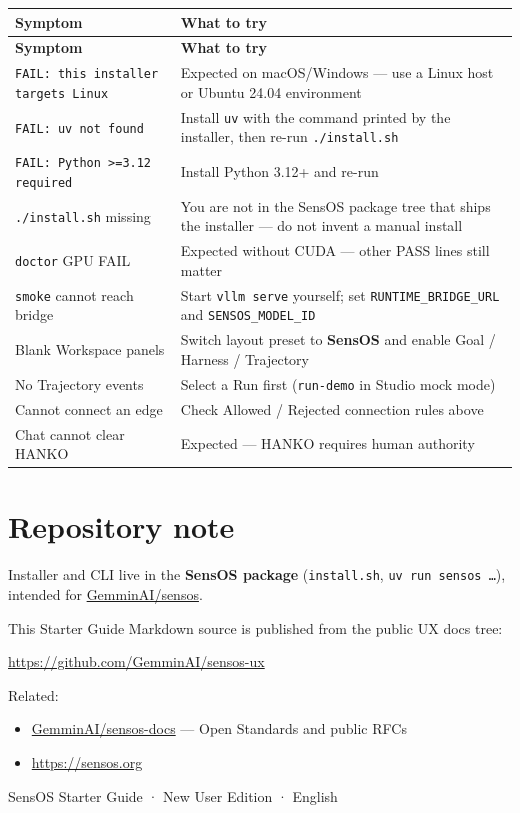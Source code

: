 \documentclass[11pt,a4paper,oneside]{article}
\newcommand{\pathcode}[1]{\texttt{#1}}
\begin{document}
{\small
\begin{longtable}{@{}p{}p{}@{}}
\toprule
\textbf{Symptom} & \textbf{What to try} \\
\midrule
\endfirsthead
\toprule
\textbf{Symptom} & \textbf{What to try} \\
\midrule
\endhead
\bottomrule
\endfoot
\texttt{FAIL: this installer targets Linux} & Expected on macOS/Windows — use a Linux host or Ubuntu 24.04 environment \\
\texttt{FAIL: uv not found} & Install \texttt{uv} with the command printed by the installer, then re-run \texttt{./install.sh} \\
\texttt{FAIL: Python >=3.12 required} & Install Python 3.12+ and re-run \\
\texttt{./install.sh} missing & You are not in the SensOS package tree that ships the installer — do not invent a manual install \\
\texttt{doctor} GPU FAIL & Expected without CUDA — other PASS lines still matter \\
\texttt{smoke} cannot reach bridge & Start \texttt{vllm serve} yourself; set \texttt{RUNTIME\_BRIDGE\_URL} and \texttt{SENSOS\_MODEL\_ID} \\
Blank Workspace panels & Switch layout preset to \textbf{SensOS} and enable Goal / Harness / Trajectory \\
No Trajectory events & Select a Run first (\texttt{run-demo} in Studio mock mode) \\
Cannot connect an edge & Check Allowed / Rejected connection rules above \\
Chat cannot clear HANKO & Expected — HANKO requires human authority \\
\end{longtable}
}

\section{Repository note}
\label{sec:repos}

Installer and CLI live in the \textbf{SensOS package} (\pathcode{install.sh}, \pathcode{uv run sensos \ldots}), intended for \href{https://github.com/GemminAI/sensos}{GemminAI/sensos}.

This Starter Guide Markdown source is published from the public UX docs tree:

\url{https://github.com/GemminAI/sensos-ux}

Related:

\begin{itemize}
  \item \href{https://github.com/GemminAI/sensos-docs}{GemminAI/sensos-docs} — Open Standards and public RFCs
  \item \url{https://sensos.org}
\end{itemize}

\vspace{1.5em}
\begin{center}
\color{SensMuted}\small
SensOS Starter Guide · New User Edition · English
\end{center}
\end{document}
